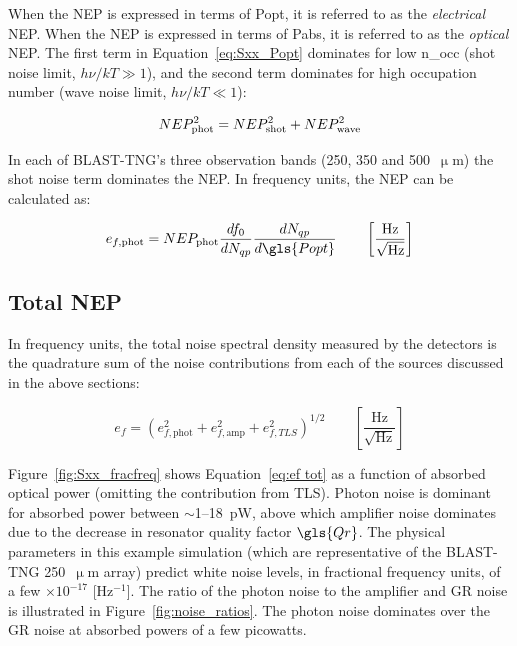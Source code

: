 When the NEP is expressed in terms of \gls{Popt}, it is referred to as the \textit{electrical} NEP. When the NEP is expressed in terms of \gls{Pabs}, it is referred to as the \textit{optical} NEP. The first term in Equation~\ref{eq:Sxx_Popt} dominates for low \gls{n_occ} (shot noise limit, $h\nu / kT \gg 1$), and the second term dominates for high occupation number (wave noise limit, $h\nu / kT \ll 1$):

\begin{equation}\label{eq:NEP phot}
NEP_{\mathrm{phot}}^{2} = NEP_{\mathrm{shot}}^{2} + NEP_{\mathrm{wave}}^{2} \\
\end{equation}

In each of BLAST-TNG's three observation bands (250, 350 and 500~$\upmu$m) the shot noise term dominates the NEP. In frequency units, the NEP can be calculated as:

\begin{equation} \label{eq:ef phot}
  e_{f,\mathrm{phot}} = NEP_{\mathrm{phot}}\frac{df_{0}}{dN_{qp}}\frac{dN_{qp}}{d\gls{Popt}} \qquad \left[ \frac{\mathrm{Hz}}{\sqrt{\mathrm{Hz}}} \right]
\end{equation}

\subsection{Total NEP}

In frequency units, the total noise spectral density measured by the detectors is the quadrature sum of the noise contributions from each of the sources discussed in the above sections:

\begin{equation} \label{eq:ef tot}
  e_{f} = \left( e_{f,\mathrm{phot}}^{2}  + e_{f,\mathrm{amp}}^{2} + e_{f,TLS}^{2} \right)^{1/2} \qquad \left[ \frac{\mathrm{Hz}}{\sqrt{\mathrm{Hz}}} \right]
\end{equation}

Figure~\ref{fig:Sxx_fracfreq} shows Equation~\ref{eq:ef tot} as a function of absorbed optical power (omitting the contribution from TLS). Photon noise is dominant for absorbed power between $\sim$1--18~pW, above which amplifier noise dominates due to the decrease in resonator quality factor $\gls{Qr}$. The physical parameters in this example simulation (which are representative of the BLAST-TNG 250~$\upmu$m array) predict white noise levels, in fractional frequency units, of a few $\times 10^{-17}$ [Hz$^{-1}$]. The ratio of the photon noise to the amplifier and GR noise is illustrated in Figure~\ref{fig:noise_ratios}. The photon noise dominates over the GR noise at absorbed powers of a few picowatts.

